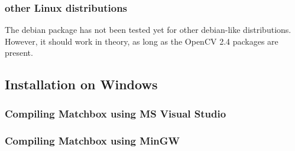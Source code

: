 \subsubsection{other Linux distributions}
The debian package has not been tested yet for other debian-like distributions.
However, it should work in theory, as long as the OpenCV 2.4 packages are present.

\subsection{Installation on Windows}

\subsubsection{Compiling Matchbox using MS Visual Studio}

\subsubsection{Compiling Matchbox using MinGW}